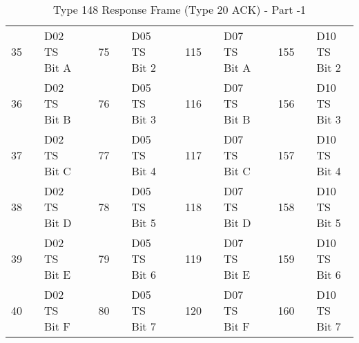 \documentclass[]{article}
\begin{document}
\begin{landscape}
\begin{table}[]
\begin{tabular}{lllllllllllllll}
			35           &                    & D02 TS Bit A                  &                   & 75           &                     & D05 TS Bit 2      &  & 115          &                     & D07 TS Bit A      &  & 155          &                     & D10 TS Bit 2      \\
			36           &                    & D02 TS Bit B                  &                   & 76           &                     & D05 TS Bit 3      &  & 116          &                     & D07 TS Bit B      &  & 156          &                     & D10 TS Bit 3      \\
			37           &                    & D02 TS Bit C                  &                   & 77           &                     & D05 TS Bit 4      &  & 117          &                     & D07 TS Bit C      &  & 157          &                     & D10 TS Bit 4      \\
			38           &                    & D02 TS Bit D                  &                   & 78           &                     & D05 TS Bit 5      &  & 118          &                     & D07 TS Bit D      &  & 158          &                     & D10 TS Bit 5      \\
			39           &                    & D02 TS Bit E                  &                   & 79           &                     & D05 TS Bit 6      &  & 119          &                     & D07 TS Bit E      &  & 159          &                     & D10 TS Bit 6      \\
			40           &                    & D02 TS Bit F                  &                   & 80           &                     & D05 TS Bit 7      &  & 120          &                     & D07 TS Bit F      &  & 160          &                     & D10 TS Bit 7      \\ \cline{1-3} \cline{5-7} \cline{9-11} \cline{13-15} 
		\end{tabular}
		\caption{Type 148 Response Frame (Type 20 ACK) - Part -1}
		\label{tab:type-148-frame-part-1}
	\end{table}
\end{landscape}
\end{document}
